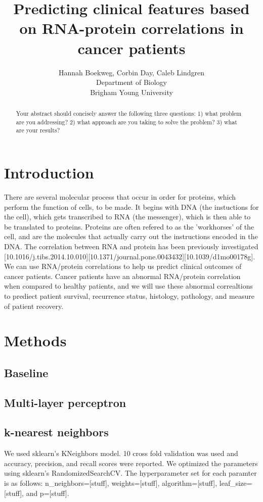 \documentclass{article}
\title{Predicting clinical features based on RNA-protein correlations in cancer patients}
\author{Hannah Boekweg, Corbin Day, Caleb Lindgren \\
Department of Biology\\
Brigham Young University}
\begin{document}
\maketitle

\begin{abstract}
  Your abstract should concisely answer the following three questions: 1) what problem are you addressing? 2) what approach are you taking to solve the problem? 3) what are your results?
\end{abstract}

\section{Introduction}
There are several molecular process that occur in order for proteins, which perform the function of cells, to be made. 
It begins with DNA (the instuctions for the cell), which gets transcribed to RNA (the messenger), which is then able to be translated to proteins. 
Proteins are often refered to as the 'workhorses' of the cell, and are the molecules that actually carry out the instructions encoded in the DNA.
The correlation between RNA and protein has been previously investigated [10.1016/j.tibs.2014.10.010][10.1371/journal.pone.0043432][10.1039/d1mo00178g]. 
We can use RNA/protein correlations to help us predict clinical outcomes of cancer patients. Cancer patients have an abnormal RNA/protein correlation when compared to healthy patients, and we will use these abnormal correaltions to prediect patient survival, recurrence status, histology, pathology, and measure of patient recovery. 


\section{Methods}

\subsection{Baseline}

\subsection{Multi-layer perceptron}

\subsection{k-nearest neighbors}
We used sklearn's KNeighbors model. 10 cross fold validation was used and accuracy, precision, and recall scores were reported. 
We optimized the parameters using sklearn's RandomizedSearchCV.
The hyperparameter set for each paramter is as follows: n_neighbors=[stuff], weights=[stuff], algorithm=[stuff], leaf_size=[stuff], and p=[stuff]. 
\end{document}
